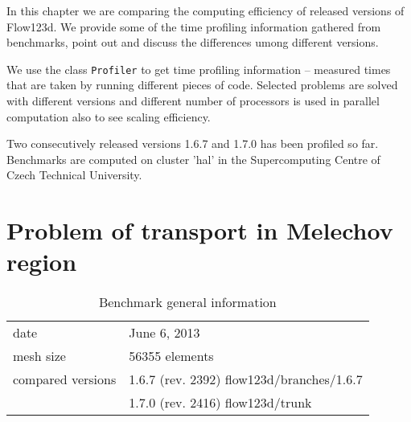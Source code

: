 %
%
%
%
%
%
%
%


In this chapter we are comparing the computing efficiency of released versions of Flow123d. We provide some 
of the time profiling information gathered from benchmarks, point out and discuss the differences umong different 
versions.

We use the class \verb'Profiler' to get time profiling information -- measured times that are taken by running different 
pieces of code. Selected problems are solved with different versions and different number 
of processors is used in parallel computation also to see scaling efficiency.

Two consecutively released versions 1.6.7 and 1.7.0 has been profiled so far. 
Benchmarks are computed on cluster 'hal' in the Supercomputing Centre of Czech Technical University.


\section{Problem of transport in Melechov region}

\begin{table}[!htb]
\centering
\begin{tabular}{ll}
date & June 6, 2013 \\
mesh size & 56355 elements \\
compared versions & 1.6.7 (rev. 2392) flow123d/branches/1.6.7 \\
                  & 1.7.0 (rev. 2416) flow123d/trunk
\end{tabular}
\caption{Benchmark general information}
\label{tab:bench1}
\end{table}

